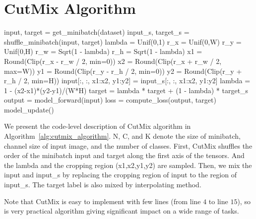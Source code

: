 \section{CutMix Algorithm}
\label{appendix:algorithm}

\algnewcommand{}%
\algnewcommand{}%
\begin{algorithm*}[t]
  \caption{Pseudo-code of CutMix}
  \begin{algorithmic}[1]
    \State input, target = get\_minibatch(dataset) 
            \State input\_s, target\_s = shuffle\_minibatch(input, target) 
            \State lambda = Unif(0,1)
            \State r\_x = Unif(0,W)
            \State r\_y = Unif(0,H)
            \State r\_w = Sqrt(1 - lambda)
            \State r\_h = Sqrt(1 - lambda)
            \State x1 = Round(Clip(r\_x - r\_w / 2, min=0))
            \State x2 = Round(Clip(r\_x + r\_w / 2, max=W))
            \State y1 = Round(Clip(r\_y - r\_h / 2, min=0))
            \State y2 = Round(Clip(r\_y + r\_h / 2, min=H))
            \State input[:, :, x1:x2, y1:y2] = input\_s[:, :, x1:x2, y1:y2]
            \State lambda = 1 - (x2-x1)*(y2-y1)/(W*H) 
            \State target = lambda * target + (1 - lambda) * target\_s 
        \EndIf
        \State output = model\_forward(input)
        \State loss = compute\_loss(output, target)
        \State model\_update()
    \EndFor
  \end{algorithmic}
  \label{alg:cutmix_algorithm}
\end{algorithm*}

We present the code-level description of CutMix algorithm in Algorithm~\ref{alg:cutmix_algorithm}.
{N, C, and K denote the size of minibatch, channel size of input image, and the number of classes.}
First, CutMix shuffles the order of the minibatch input and target along the first axis of the tensors.
And the lambda and the cropping region (x1,x2,y1,y2) are sampled. 
Then, we mix the input and input\_s by replacing the cropping region of input to the region of input\_s.
The target label is also mixed by interpolating method. 

Note that CutMix is easy to implement with few lines (from line $4$ to line $15$), so is very practical algorithm giving significant impact on a wide range of tasks.